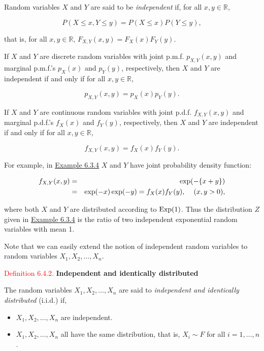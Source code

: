 \documentclass[
]{book}
\begin{document}
Random variables \(X\) and \(Y\) are said to be \emph{independent} if, for all \(x,y \in \mathbb{R}\),

\[ P(X \leq x, Y \leq y) = P(X \leq x) P(Y \leq y),\]

that is, for all \(x,y\in\mathbb R\), \(F_{X,Y}(x,y) = F_X(x) F_Y(y)\).

If \(X\) and \(Y\) are discrete random variables with joint p.m.f. \(p_{X,Y}(x,y)\) and marginal p.m.f.'s \(p_X(x)\) and \(p_Y(y)\), respectively, then \(X\) and \(Y\) are independent if and only if for all \(x,y\in\mathbb R\),

\[ p_{X,Y}(x,y) = p_X(x)p_Y(y).\]

If \(X\) and \(Y\) are continuous random variables with joint p.d.f. \(f_{X,Y}(x,y)\) and marginal p.d.f.'s \(f_X(x)\) and \(f_Y(y)\), respectively, then \(X\) and \(Y\) are independent if and only if for all \(x,y\in\mathbb R\),

\[ f_{X,Y}(x,y) = f_X(x)f_Y(y).\]

For example, in \protect\hyperlink{jointdis:exer:joint_Z_Exp}{Example 6.3.4} \(X\) and \(Y\) have joint probability density function:

\begin{eqnarray*} f_{X,Y} (x,y) &=& \exp(-\{ x + y\}) \\ &=& \exp (-x) \exp(-y) = f_X (x) f_Y(y), \hspace{0.4cm}(x,y>0),
\end{eqnarray*}

where both \(X\) and \(Y\) are distributed according to \({\rm Exp} (1)\). Thus the distribution \(Z\) given in \protect\hyperlink{jointdis:exer:joint_Z_Exp}{Example 6.3.4} is the ratio of two independent exponential random variables with mean 1.

Note that we can easily extend the notion of independent random variables to random variables \(X_1,X_2,\dots,X_n\).

\leavevmode{}%
\textcolor{red}{Definition 6.4.2.}
{\textbf{Independent and identically distributed}}

The random variables \(X_1,X_2,\dots,X_n\) are said to \emph{independent and identically distributed} (i.i.d.) if,

\begin{itemize}
\item
  \(X_1,X_2,\dots,X_n\) are independent.
\item
  \(X_1,X_2,\dots,X_n\) all have the same distribution, that is, \(X_i \sim F\) for all \(i=1,\dots,n\).
\end{itemize}
\end{document}
